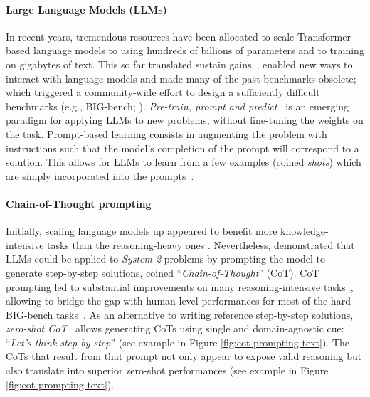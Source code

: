 \documentclass{article} \usepackage{iclr2022_conference,times}
\newcommand{\PromptOne}{\textit{Let's think step by step}}
\begin{document}
\paragraph{Large Language Models (LLMs)} In recent years, tremendous resources have been allocated to scale Transformer-based language models \citep{Brown2020-ad, Rae2021-oy, Chowdhery2022-pr, Thoppilan2022-tm, Hoffmann2022-qq, Smith2022-jc, Zhang2022-zr, Lieber2021-gw, Fedus2021-ci, Laurencon2022-rx} to using hundreds of billions of parameters and to training on gigabytes of text. This so far translated sustain gains~\citep{Kaplan2020-hw}, enabled new ways to interact with language models and made many of the past benchmarks obsolete; which triggered a community-wide effort to design a sufficiently difficult benchmarks (e.g., BIG-bench; \cite{Srivastava2022-jl}). \textit{Pre-train, prompt and predict}~\citep{Liu2021-zx} is an emerging paradigm for applying LLMs to new problems, without fine-tuning the weights on the task. Prompt-based learning consists in augmenting the problem with instructions such that the model's completion of the prompt will correspond to a solution. This allows for LLMs to learn from a few examples (coined \textit{shots}) which are simply incorporated into the prompts~\citep{Brown2020-ad}. 


\paragraph{Chain-of-Thought prompting} Initially, scaling language models up appeared to benefit more knowledge-intensive tasks than the reasoning-heavy ones \citep{Rae2021-oy}. Nevertheless, \cite{Wei2022-tw} demonstrated that LLMs could be applied to \textit{System 2} problems by prompting the model to generate step-by-step solutions, coined ``\textit{Chain-of-Thought}'' (CoT). CoT prompting led to substantial improvements on many reasoning-intensive tasks~\citep{Wei2022-tw, Zhou2022-cd, Drozdov2022-mw, Nye2021-xv}, allowing to bridge the gap with human-level performances for most of the hard BIG-bench tasks~\citep{Suzgun2022-or}. As an alternative to writing reference step-by-step solutions, \textit{zero-shot CoT}~\citep{Kojima2022-wg} allows generating CoTs using single and domain-agnostic cue: ``\PromptOne'' (see example in Figure \ref{fig:cot-prompting-text}). The CoTs that result from that prompt not only appear to expose valid reasoning but also translate into superior zero-shot performances (see example in Figure \ref{fig:cot-prompting-text}).
\end{document}
